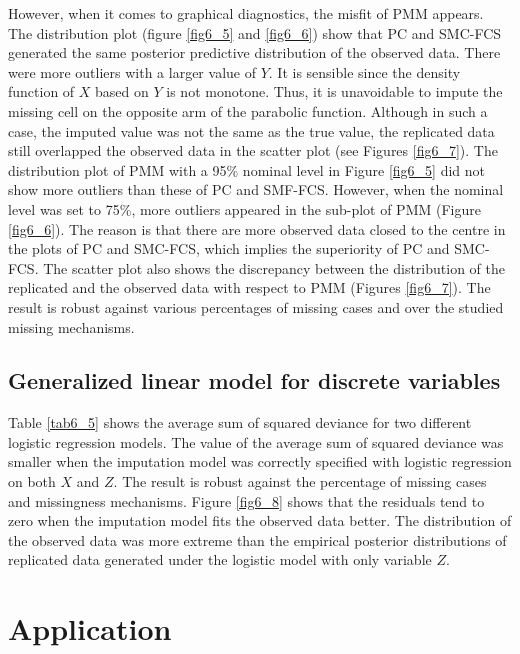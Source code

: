 \documentclass[12pt, fullpage, a4paper]{article}
\begin{document}
However, when it comes to graphical diagnostics, the misfit of PMM appears. The distribution plot (figure \ref{fig6_5} and \ref{fig6_6}) show that PC and SMC-FCS generated the same posterior predictive distribution of the observed data. There were more outliers with a larger value of $Y$. It is sensible since the density function of $X$ based on $Y$ is not monotone. Thus, it is unavoidable to impute the missing cell on the opposite arm of the parabolic function. Although in such a case, the imputed value was not the same as the true value, the replicated data still overlapped the observed data in the scatter plot (see Figures \ref{fig6_7}). The distribution plot of PMM with a 95\% nominal level in Figure \ref{fig6_5} did not show more outliers than these of PC and SMF-FCS. However, when the nominal level was set to 75\%, more outliers appeared in the sub-plot of PMM (Figure \ref{fig6_6}). The reason is that there are more observed data closed to the centre in the plots of PC and SMC-FCS, which implies the superiority of PC and SMC-FCS. The scatter plot also shows the discrepancy between the distribution of the replicated and the observed data with respect to PMM (Figures \ref{fig6_7}). The result is robust against various percentages of missing cases and over the studied missing mechanisms. 



\subsection{Generalized linear model for discrete variables}
Table \ref{tab6_5} shows the average sum of squared deviance for two different logistic regression models. The value of the average sum of squared deviance was smaller when the imputation model was correctly specified with logistic regression on both $X$ and $Z$. The result is robust against the percentage of missing cases and missingness mechanisms. Figure \ref{fig6_8} shows that the residuals tend to zero when the imputation model fits the observed data better. The distribution of the observed data was more extreme than the empirical posterior distributions of replicated data generated under the logistic model with only variable $Z$. 


\section{Application}
\end{document}
